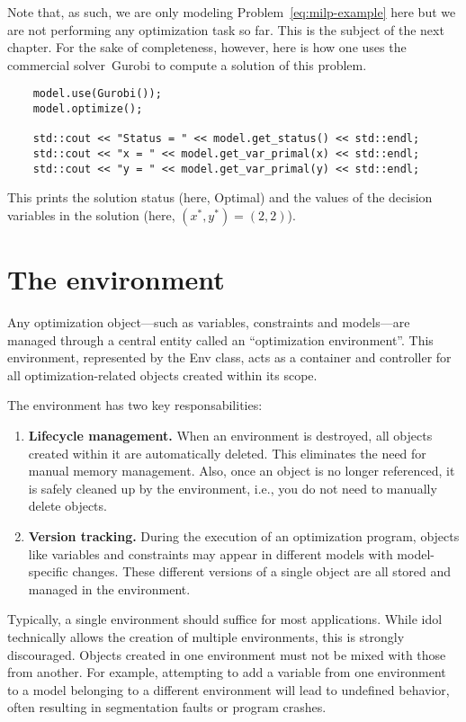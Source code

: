 Note that, as such, we are only modeling Problem~\eqref{eq:milp-example} here
but we are not performing any optimization task so far. This is the subject of
the next chapter. For the sake of completeness, however, here is how one uses
the commercial solver~\textsf{Gurobi} to compute a solution
of this problem.
%
\begin{lstlisting}
    model.use(Gurobi());
    model.optimize();

    std::cout << "Status = " << model.get_status() << std::endl;
    std::cout << "x = " << model.get_var_primal(x) << std::endl;
    std::cout << "y = " << model.get_var_primal(y) << std::endl;
\end{lstlisting}

This prints the solution status (here, \textsf{Optimal}) and the values of the
decision variables in the solution (here, $(x^*,y^*) = (2,2)$). 

\section{The environment}

Any optimization object---such as variables, constraints and models---are
managed through a central entity called an ``optimization environment''.
This environment, represented by the \textsf{Env} class, acts as a container 
and controller for all optimization-related objects created within its scope.

The environment has two key responsabilities:
\begin{enumerate}
    \item \textbf{Lifecycle management.} When an environment is destroyed, all
    objects created within it are automatically deleted. This eliminates the
    need for manual memory management. Also, once an object is no longer
    referenced, it is safely cleaned up by the environment, i.e., you do not
    need to manually delete objects.
    \item \textbf{Version tracking.} During the execution of an optimization
    program, objects like variables and constraints may appear in different
    models with model-specific changes. These different versions of a single
    object are all stored and managed in the environment.  
\end{enumerate}

Typically, a single environment should suffice for most applications. While
\textsf{idol} technically allows the creation of multiple environments, this
is strongly discouraged. Objects created in one environment must not be mixed
with those from another. For example, attempting to add a variable from one
environment to a model belonging to a different environment will lead to
undefined behavior, often resulting in segmentation faults or program crashes.

